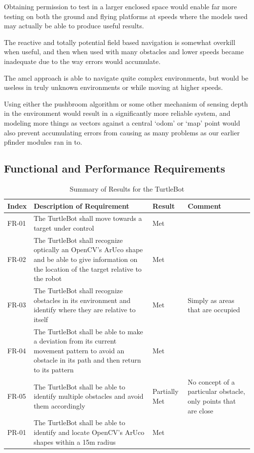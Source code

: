 \documentclass{article}[12]
\begin{document}
Obtaining permission to test in a larger enclosed space would enable far more testing on both the ground and flying platforms at speeds where the models used may actually be able to produce useful results. 

The reactive and totally potential field based navigation is somewhat overkill when useful, and then when used with many obstacles and lower speeds became inadequate due to the way errors would accumulate.

The amcl approach is able to navigate quite complex environments, but would be useless in truly unknown environments or while moving at higher speeds. 

Using either the pushbroom algorithm or some other mechanism of sensing depth in the environment would result in a significantly more reliable system, and modeling more things as vectors against a central `odom' or `map' point would also prevent accumulating errors from causing as many problems as our earlier pfinder modules ran in to.
 
 \subsection{Functional and Performance Requirements}

	\begin{table}[H]
  \small
		\begin{tabular}{p{2cm} p{8cm} p{2cm} p{3cm}} 
			\hline
			{\textbf{Index}} & {\textbf{Description of Requirement}} & {\textbf{Result}} & {\textbf{Comment}} \\ \hline
FR-01 & The TurtleBot shall move towards a target under control & Met & \\
FR-02 & The TurtleBot shall recognize optically an OpenCV's ArUco shape and be able to give information on the location of the target relative to the robot & Met & \\
FR-03 & The TurtleBot shall recognize obstacles in its environment and identify where they are relative to itself & Met & Simply as areas that are occupied \\
FR-04 & The TurtleBot shall be able to make a deviation from its current movement pattern to avoid an obstacle in its path and then return to its pattern & Met & \\
FR-05 & The TurtleBot shall be able to identify multiple obstacles and avoid them accordingly & Partially Met & No concept of a particular obstacle, only points that are close \\
PR-01 & The TurtleBot shall be able to identify and locate OpenCV's ArUco shapes within a 15m radius & Met & \\ \hline
     \end{tabular}
     \caption{Summary of Results for the TurtleBot}
     \label{table:turtlbotresults}
 \end{table}
\end{document}
